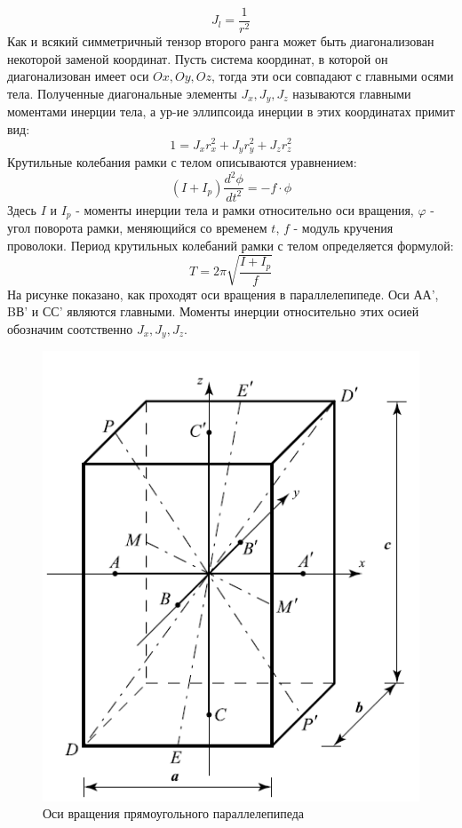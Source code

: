 \documentclass[a4paper,12pt]{article} %
\begin{document}
\begin{equation}
    J_{l} = \frac{1}{r^2}
    \label{ссылка}
\end{equation}
Как и всякий симметричный тензор второго ранга может быть диагонализован некоторой заменой координат. 
Пусть система координат, в которой он диагонализован имеет оси $Ox,Oy,Oz$, тогда эти оси совпадают с главными осями тела.
Полученные диагональные элементы $J_{x}, J_{y}, J_{z}$ называются главными моментами инерции тела, а ур-ие эллипсоида
 инерции в этих координатах примит вид:
\begin{equation}
    1 = J_{x}r^{2}_{x}+J_{y}r^{2}_{y}+J_{z}r^{2}_{z}
\end{equation}
Крутильные колебания рамки с телом описываются уравнением:
\begin{equation}
    (I+I_{p})\frac{d^2 \phi}{d t^2} = -f \cdot \phi
\end{equation}
Здесь $I$ и $I_{p}$ - моменты инерции тела и рамки относительно
 оси вращения, $\varphi$ - угол поворота рамки, меняющийся со
временем $t$, $f$ - модуль кручения проволоки. Период крутильных
 колебаний рамки с телом определяется формулой:
\begin{equation}
    T = 2\pi\sqrt{\frac{I+I_{p}}{f}}
\end{equation}
На рисунке показано, как проходят оси вращения в параллелепипеде.
 Оси АА', BВ' и СС' являются главными. Моменты инерции относительно
этих осией обозначим соотственно $J_{x}, J_{y}, J_{z}$.\\

 \begin{figure}[!h]
    \begin{center}
        \includegraphics[scale=1]{kyb}
        \caption{Оси вращения прямоугольного параллелепипеда}
        \label{graphic1}
    \end{center}
\end{figure}
\end{document}
